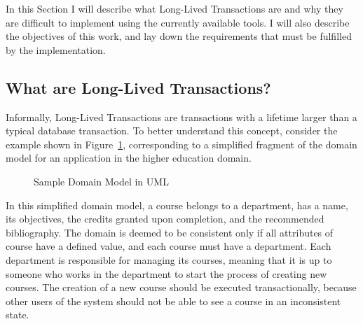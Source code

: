 \documentclass{llncs}
\begin{document}
In this Section I will describe what Long-Lived Transactions are and
why they are difficult to implement using the currently available
tools. I will also describe the objectives of this work, and lay down
the requirements that must be fulfilled by the implementation.

\subsection{What are Long-Lived Transactions?}
\label{sec:what}

Informally, Long-Lived Transactions are transactions with a lifetime
larger than a typical database transaction. To better understand this
concept, consider the example shown in Figure~\ref{fig:courseDomain},
corresponding to a simplified fragment of the domain model for an
application in the higher education domain.

\begin{figure}
  \centering

\caption{Sample Domain Model in UML}
\label{fig:courseDomain}

\end{figure}

In this simplified domain model, a course belongs to a department, has
a name, its objectives, the credits granted upon completion, and the
recommended bibliography. The domain is deemed to be consistent only
if all attributes of course have a defined value, and each course must
have a department. Each department is responsible for managing its
courses, meaning that it is up to someone who works in the department
to start the process of creating new courses. The creation of a new
course should be executed transactionally, because other users of the
system should not be able to see a course in an inconsistent state.
\end{document}
